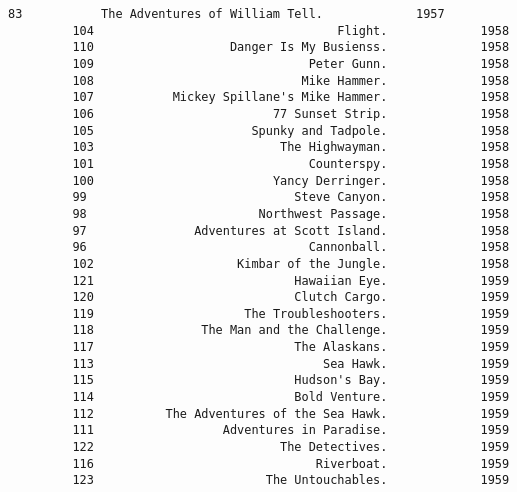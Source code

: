 \documentclass[11pt]{article}
\begin{document}
\begin{Verbatim}[commandchars=\\\{\}]
         83           The Adventures of William Tell.             1957   
         104                                  Flight.             1958   
         110                   Danger Is My Busienss.             1958   
         109                              Peter Gunn.             1958   
         108                             Mike Hammer.             1958   
         107           Mickey Spillane's Mike Hammer.             1958   
         106                         77 Sunset Strip.             1958   
         105                      Spunky and Tadpole.             1958   
         103                          The Highwayman.             1958   
         101                              Counterspy.             1958   
         100                         Yancy Derringer.             1958   
         99                             Steve Canyon.             1958   
         98                        Northwest Passage.             1958   
         97               Adventures at Scott Island.             1958   
         96                               Cannonball.             1958   
         102                    Kimbar of the Jungle.             1958   
         121                            Hawaiian Eye.             1959   
         120                            Clutch Cargo.             1959   
         119                     The Troubleshooters.             1959   
         118               The Man and the Challenge.             1959   
         117                            The Alaskans.             1959   
         113                                Sea Hawk.             1959   
         115                            Hudson's Bay.             1959   
         114                            Bold Venture.             1959   
         112          The Adventures of the Sea Hawk.             1959   
         111                  Adventures in Paradise.             1959   
         122                          The Detectives.             1959   
         116                               Riverboat.             1959   
         123                        The Untouchables.             1959   
         

\end{Verbatim}
\end{document}
